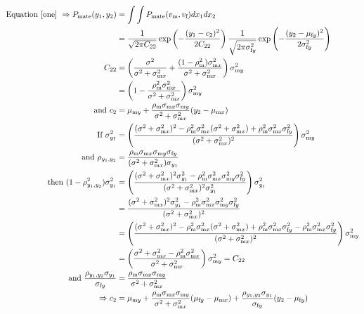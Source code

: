 \documentclass{article}
\newcommand{\x}[1]{\text{#1}}
\begin{document}
\begin{align*}
\text{Equation \ref{one} } \Rightarrow P_\text{mate}(y_1,y_2)&=\int \int P_\text{mate}(v_\x{m},v_\x{f})dx_1dx_2
\\&=\frac{1}{\sqrt{2\pi C_{22}}}\exp\left(-\frac{(y_1-c_2)^2}{2C_{22}}\right)\frac{1}{\sqrt{2\pi\sigma_{\x{f}y}^2}}\exp\left(-\frac{(y_2-\mu_{\x{f}y})^2}{2\sigma_{\x{f}y}^2}\right)
\\C_{22}&=\left(\frac{\sigma^2}{\sigma^2+\sigma_{\x{m}x}^2}+\frac{(1-\rho_\x{m}^2)\sigma_{\x{m}x}^2}{\sigma^2+\sigma_{\x{m}x}^2}\right)\sigma_{\x{m}y}^2
\\&=\left(1-\frac{\rho_\x{m}^2\sigma_{\x{m}x}^2}{\sigma^2+\sigma_{\x{m}x}^2}\right)\sigma_{\x{m}y}^2
\\ \text{ and } c_2&=\mu_{\x{m}y}+\frac{\rho_\x{m}\sigma_{\x{m}x}\sigma_{\x{m}y}}{\sigma^2+\sigma_{\x{m}x}^2}(y_2-\mu_{\x{m}x})
\\ \text{If } \sigma_{y_1}^2&=\left(\frac{(\sigma^2+\sigma_{\x{m}x}^2)^2-\rho_\x{m}^2\sigma_{\x{m}x}^2(\sigma^2+\sigma_{\x{m}x}^2)+\rho_\x{m}^2\sigma_{\x{m}x}^2\sigma_{\x{f}y}^2}{(\sigma^2+\sigma_{\x{m}x}^2)^2}\right)\sigma_{\x{m}y}^2
\\ \text{ and } \rho_{y_1,y_2}&=\frac{\rho_\x{m}\sigma_{\x{m}x}\sigma_{\x{m}y}\sigma_{\x{f}y}}{(\sigma^2+\sigma_{\x{m}x}^2)\sigma_{y_1}}
\\ \text{ then } (1-\rho_{y_1,y_2}^2)\sigma_{y_1}^2&=\left(\frac{(\sigma^2+\sigma_{\x{m}x}^2)^2\sigma_{y_1}^2-\rho_\x{m}^2\sigma_{\x{m}x}^2\sigma_{\x{m}y}^2\sigma_{\x{f}y}^2}{(\sigma^2+\sigma_{\x{m}x}^2)^2\sigma_{y_1}^2} \right)\sigma_{y_1}^2
\\&=\frac{(\sigma^2+\sigma_{\x{m}x}^2)^2\sigma_{y_1}^2-\rho_\x{m}^2\sigma_{\x{m}x}^2\sigma_{\x{m}y}^2\sigma_{\x{f}y}^2}{(\sigma^2+\sigma_{\x{m}x}^2)^2}
\\&=\left(\frac{(\sigma^2+\sigma_{\x{m}x}^2)^2-\rho_\x{m}^2\sigma_{\x{m}x}^2(\sigma^2+\sigma_{\x{m}x}^2)+\rho_\x{m}^2\sigma_{\x{m}x}^2\sigma_{\x{f}y}^2-\rho_\x{m}^2\sigma_{\x{m}x}^2\sigma_{\x{f}y}^2}{(\sigma^2+\sigma_{\x{m}x}^2)^2}\right)\sigma_{\x{m}y}^2
\\&=\left(\frac{\sigma^2+\sigma_{\x{m}x}^2-\rho_\x{m}^2\sigma_{\x{m}x}^2}{\sigma^2+\sigma_{\x{m}x}^2}\right)\sigma_{\x{m}y}^2=C_{22}
\\ \text{ and } \frac{\rho_{y_1,y_2}\sigma_{y_1}}{\sigma_{\x{f}y}}&=\frac{\rho_\x{m}\sigma_{\x{m}x}\sigma_{\x{m}y}}{\sigma^2+\sigma_{\x{m}x}^2}
\\ \Rightarrow c_2&=\mu_{\x{m}y}+\frac{\rho_\x{m}\sigma_{\x{m}x}\sigma_{\x{m}y}}{\sigma^2+\sigma_{\x{m}x}^2}(\mu_{\x{f}y}-\mu_{\x{m}x})+\frac{\rho_{y_1,y_2}\sigma_{y_1}}{\sigma_{\x{f}y}}(y_2-\mu_{\x{f}y})

\end{align*}
\end{document}
